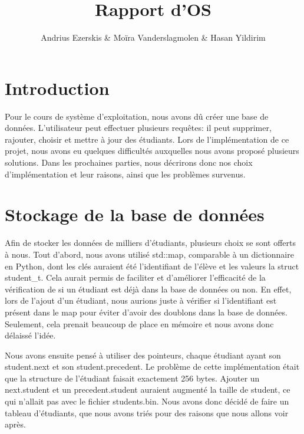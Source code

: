 \documentclass[utf8]{article}
\begin{document}
\begin{titlepage}
    

\author{Andrius Ezerskis \& Moïra Vanderslagmolen \& Hasan Yildirim}
\title{Rapport d'OS}

\maketitle
\end{titlepage}

\section{Introduction}
\par
Pour le cours de système d'exploitation, nous avons dû créer une base de données. 
L'utilisateur peut effectuer plusieurs requêtes: il peut supprimer, rajouter, choisir
et mettre à jour des étudiants. Lors de l'implémentation de ce projet, nous avons eu quelques difficultés
auxquelles nous avons proposé plusieurs solutions. Dans les prochaines parties, nous décrirons donc
nos choix d'implémentation et leur raisons, ainsi que les problèmes survenus.
\par


\section{Stockage de la base de données}
\indent{}
\par
Afin de stocker les données de milliers d'étudiants, plusieurs choix se sont offerts à nous. 
Tout d'abord, nous avons utilisé std::map, comparable à un dictionnaire en Python, dont les
clés auraient été l'identifiant de l'élève et les valeurs la struct student\_t. 
Cela aurait permis de faciliter et d'améliorer l'efficacité de la vérification de si un étudiant est déjà dans la base de données ou non. En effet, lors de l'ajout d'un étudiant, nous aurions juste à vérifier si l'identifiant est présent dans le map pour éviter d'avoir des doublons dans la base de données.
Seulement, cela prenait beaucoup de place en mémoire et nous avons donc délaissé l'idée. 
\par
\indent{}
\par
Nous avons ensuite pensé à utiliser des pointeurs, chaque étudiant
ayant son student.next et son student.precedent. Le problème de cette implémentation était que la structure de l'étudiant faisait exactement 256 bytes.
Ajouter un next.student et un precedent.student auraient augmenté la taille de student, ce qui n'allait pas avec le fichier students.bin.
Nous avons donc décidé de faire un tableau d'étudiants, que nous avons triés pour des raisons que nous allons voir après.
\par
\end{document}
